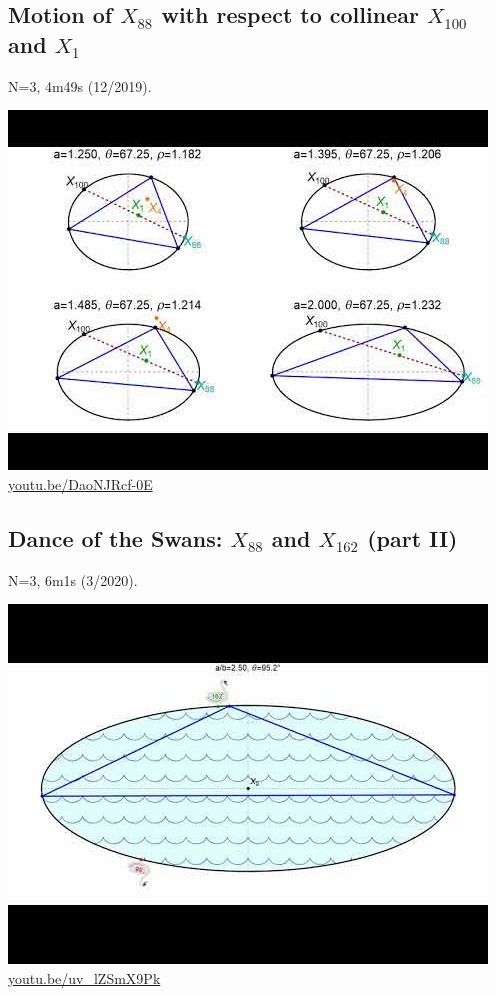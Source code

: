 \documentclass[12pt]{amsart}
\begin{document}
\subsection{Motion of $X_{88}$ with respect to collinear $X_{100}$ and $X_{1}$}
\label{vid:DaoNJRcf-0E}
\noindent N=3, 4m49s (12/2019). 
\begin{center}\includegraphics[width=.5\textwidth]{pics/DaoNJRcf-0E.jpg} \\ 
\href{https://youtu.be/DaoNJRcf-0E}{\url{youtu.be/DaoNJRcf-0E}}\end{center}
% 

\subsection{Dance of the Swans: $X_{88}$ and $X_{162}$ (part II)}
\label{vid:uv_lZSmX9Pk}
\noindent N=3, 6m1s (3/2020). 
\begin{center}\includegraphics[width=.5\textwidth]{pics/uv_lZSmX9Pk.jpg} \\ 
\href{https://youtu.be/uv_lZSmX9Pk}{\url{youtu.be/uv\_lZSmX9Pk}}\end{center}
% 
\end{document}
